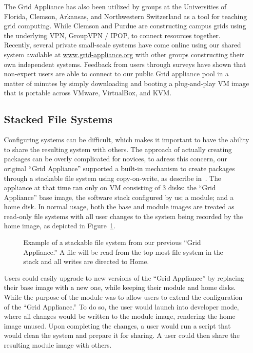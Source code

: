 \documentclass[conference]{IEEEtran}
\begin{document}
The Grid Appliance has also been utilized by groups at the Universities of
Florida, Clemson, Arkansas, and Northwestern Switzerland as a tool for teaching
grid computing.  While Clemson and Purdue are constructing campus grids using
the underlying VPN, GroupVPN / IPOP, to connect resources together.  Recently,
several private small-scale systems have come online using our shared system
available at \url{www.grid-appliance.org} with other groups constructing their
own independent systems.  Feedback from users through surveys have shown that
non-expert users are able to connect to our public Grid appliance pool in a
matter of minutes by simply downloading and booting a plug-and-play VM image
that is portable across VMware, VirtualBox, and KVM.

\subsection{Stacked File Systems}

Configuring systems can be difficult, which makes it important to have the
ability to share the resulting system with others.  The approach of actually
creating packages can be overly complicated for novices, to adress this
concern, our original ``Grid Appliance'' supported a built-in mechanism to
create packages through a stackable file system using copy-on-write, as
describe in~\cite{vtdc}.  The appliance at that time ran only on VM consisting
of 3 disks: the ``Grid Appliance'' base image, the software stack configured by
us; a module; and a home disk.  In normal usage, both the base and module
images are treated as read-only file systems with all user changes to the
system being recorded by the home image, as depicted in
Figure~\ref{fig:stackfs}.

\begin{figure}[ht]
\centering
{}
\caption{Example of a stackable file system from our previous ``Grid
Appliance.''  A file will be read from the top most file system in the stack
and all writes are directed to Home.}
\label{fig:stackfs}
\end{figure}

Users could easily upgrade to new versions of the ``Grid Appliance'' by
replacing their base image with a new one, while keeping their module and home
disks.  While the purpose of the module was to allow users to extend the
configuration of the ``Grid Appliance.''  To do so, the user would launch into
developer mode, where all changes would be written to the module image,
rendering the home image unused.  Upon completing the changes, a user would run
a script that would clean the system and prepare it for sharing.  A user could
then share the resulting module image with others.
\end{document}
